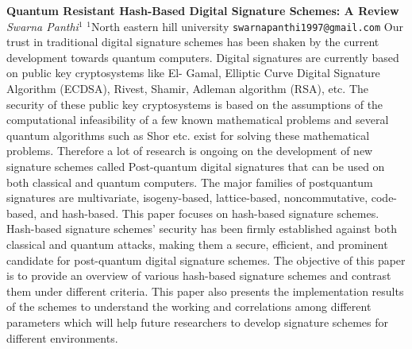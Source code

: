 
    \begin{conf-abstract}[]
        {\textbf{Quantum Resistant Hash-Based Digital Signature Schemes: A Review}}
        {\textit{Swarna Panthi$^{1}$}}
        {$^{1}$North eastern hill university}
        {\texttt{swarnapanthi1997@gmail.com}}
        {Our trust in traditional digital signature schemes has been shaken by the current development towards quantum computers. Digital signatures are currently based on public key cryptosystems like El- Gamal, Elliptic Curve Digital Signature Algorithm (ECDSA), Rivest, Shamir, Adleman algorithm (RSA), etc. The security of these public key cryptosystems is based on the assumptions of the computational infeasibility of a few known mathematical problems and several quantum algorithms such as Shor etc. exist for solving these mathematical problems. Therefore a lot of research is ongoing on the development of new signature schemes called Post-quantum digital signatures that can be used on both classical and quantum computers. The major families of postquantum signatures are multivariate, isogeny-based, lattice-based, noncommutative, code-based, and hash-based. This paper focuses on hash-based signature schemes. Hash-based signature schemes' security has been firmly established against both classical and quantum attacks, making them a secure, efficient, and prominent candidate for post-quantum digital signature schemes. The objective of this paper is to provide an overview of various hash-based signature schemes and contrast them under different criteria. This paper also presents the implementation results of the schemes to understand the working and correlations among different parameters which will help future researchers to develop signature schemes for different environments.}
    \end{conf-abstract}
        